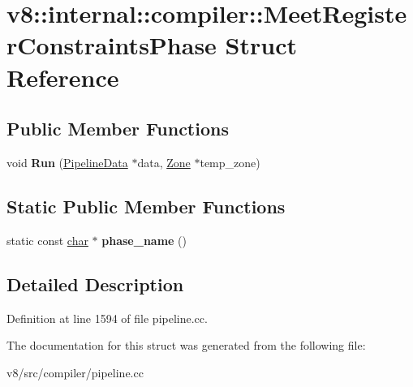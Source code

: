 \hypertarget{structv8_1_1internal_1_1compiler_1_1MeetRegisterConstraintsPhase}{}\section{v8\+:\+:internal\+:\+:compiler\+:\+:Meet\+Register\+Constraints\+Phase Struct Reference}
\label{structv8_1_1internal_1_1compiler_1_1MeetRegisterConstraintsPhase}
\subsection*{Public Member Functions}
\begin{DoxyCompactItemize}
\item 
\mbox{\label{structv8_1_1internal_1_1compiler_1_1MeetRegisterConstraintsPhase_aeca7630ba5d72b33c274b40ef028c726}} 
void {\bfseries Run} (\mbox{\hyperlink{classv8_1_1internal_1_1compiler_1_1PipelineData}{Pipeline\+Data}} $\ast$data, \mbox{\hyperlink{classv8_1_1internal_1_1Zone}{Zone}} $\ast$temp\+\_\+zone)
\end{DoxyCompactItemize}
\subsection*{Static Public Member Functions}
\begin{DoxyCompactItemize}
\item 
\mbox{\label{structv8_1_1internal_1_1compiler_1_1MeetRegisterConstraintsPhase_ac5b8560af5acad57b9886dcc4cb482ed}} 
static const \mbox{\hyperlink{classchar}{char}} $\ast$ {\bfseries phase\+\_\+name} ()
\end{DoxyCompactItemize}


\subsection{Detailed Description}


Definition at line 1594 of file pipeline.\+cc.



The documentation for this struct was generated from the following file\+:\begin{DoxyCompactItemize}
\item 
v8/src/compiler/pipeline.\+cc\end{DoxyCompactItemize}
